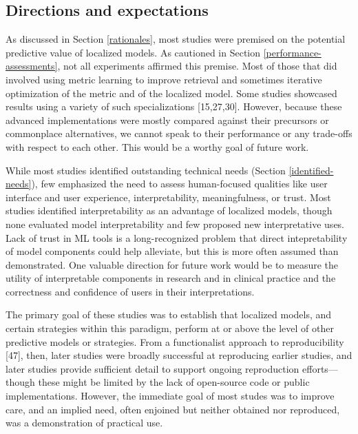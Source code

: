 \documentclass[preprint, 3p,
authoryear]{elsarticle} %
\begin{document}
\hypertarget{directions-and-expectations}{%
\subsection{Directions and
expectations}\label{directions-and-expectations}}

As discussed in Section \ref{rationales}, most studies were premised on
the potential predictive value of localized models. As cautioned in
Section \ref{performance-assessments}, not all experiments affirmed this
premise. Most of those that did involved using metric learning to
improve retrieval and sometimes iterative optimization of the metric and
of the localized model. Some studies showcased results using a variety
of such specializations {[}15,27,30{]}. However, because these advanced
implementations were mostly compared against their precursors or
commonplace alternatives, we cannot speak to their performance or any
trade-offs with respect to each other. This would be a worthy goal of
future work.

While most studies identified outstanding technical needs (Section
\ref{identified-needs}), few emphasized the need to assess human-focused
qualities like user interface and user experience, interpretability,
meaningfulness, or trust. Most studies identified interpretability as an
advantage of localized models, though none evaluated model
interpretability and few proposed new interpretative uses. Lack of trust
in ML tools is a long-recognized problem that direct intepretability of
model components could help alleviate, but this is more often assumed
than demonstrated. One valuable direction for future work would be to
measure the utility of interpretable components in research and in
clinical practice and the correctness and confidence of users in their
interpretations.

The primary goal of these studies was to establish that localized
models, and certain strategies within this paradigm, perform at or above
the level of other predictive models or strategies. From a functionalist
approach to reproducibility {[}47{]}, then, later studies were broadly
successful at reproducing earlier studies, and later studies provide
sufficient detail to support ongoing reproduction efforts---though these
might be limited by the lack of open-source code or public
implementations. However, the immediate goal of most studes was to
improve care, and an implied need, often enjoined but neither obtained
nor reproduced, was a demonstration of practical use.
\end{document}
